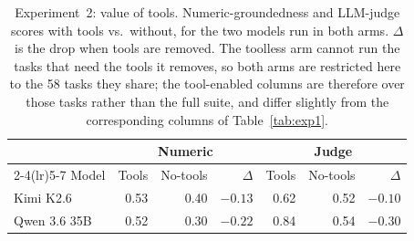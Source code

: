 \begin{table}[!t]
\centering
\caption{Experiment~2: value of tools. Numeric-groundedness and LLM-judge scores with tools vs.\ without, for the two models run in both arms. $\Delta$ is the drop when tools are removed. The toolless arm cannot run the tasks that need the tools it removes, so both arms are restricted here to the 58 tasks they share; the tool-enabled columns are therefore over those tasks rather than the full suite, and differ slightly from the corresponding columns of Table~\ref{tab:exp1}.}
\label{tab:exp1_toolless}
\small
\setlength{\tabcolsep}{4pt}
\begin{tabular}{@{}lrrrrrr@{}}
\toprule
& \multicolumn{3}{c}{Numeric} & \multicolumn{3}{c}{Judge} \\
\cmidrule(lr){2-4}\cmidrule(lr){5-7}
Model & Tools & No-tools & $\Delta$ & Tools & No-tools & $\Delta$ \\
\midrule
Kimi K2.6 & 0.53 & 0.40 & $-0.13$ & 0.62 & 0.52 & $-0.10$ \\
Qwen 3.6 35B & 0.52 & 0.30 & $-0.22$ & 0.84 & 0.54 & $-0.30$ \\
\bottomrule
\end{tabular}
\end{table}
